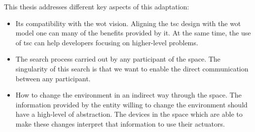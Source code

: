 This thesis addresses different key aspects of this adaptation:
\begin{itemize}
  \item Its compatibility with the \ac{wot} vision.
	Aligning the \ac{tsc} design with the \ac{wot} model one can many of the benefits provided by it.
	At the same time, the use of \ac{tsc} can help developers focusing on higher-level problems.
  \item The search process carried out by any participant of the space.
	The singularity of this search is that we want to enable the direct communication between any participant.
  \item How to change the environment in an indirect way through the space.
	The information provided by the entity willing to change the environment should have a high-level of abstraction. %
	The devices in the space which are able to make these changes interpret that information to use their actuators.
\end{itemize}
